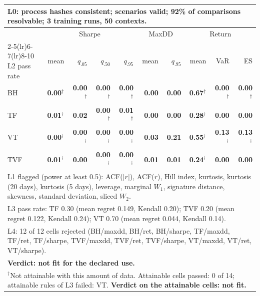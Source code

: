 \begin{tabular}{lrrrrrrrrr}
\toprule
\multicolumn{10}{p{13.5cm}}{L0: process hashes consistent; scenarios valid; 92\% of comparisons resolvable; 3 training runs, 50 contexts.} \\
\midrule
 & \multicolumn{4}{c}{Sharpe} & \multicolumn{2}{c}{MaxDD} & \multicolumn{3}{c}{Return} \\
\cmidrule(lr){2-5}\cmidrule(lr){6-7}\cmidrule(lr){8-10}
L2 pass rate & mean & $q_{.05}$ & $q_{.50}$ & $q_{.95}$ & mean & $q_{.95}$ & mean & VaR & ES \\
\midrule
BH & \textbf{0.00}$^{\dagger}$ & \textbf{0.00}$^{\dagger}$ & \textbf{0.00}$^{\dagger}$ & \textbf{0.00}$^{\dagger}$ & \textbf{0.00} & \textbf{0.00} & \textbf{0.67}$^{\dagger}$ & \textbf{0.00}$^{\dagger}$ & \textbf{0.00}$^{\dagger}$ \\
TF & \textbf{0.01}$^{\dagger}$ & \textbf{0.02} & \textbf{0.00}$^{\dagger}$ & \textbf{0.01}$^{\dagger}$ & \textbf{0.00} & \textbf{0.00} & \textbf{0.28}$^{\dagger}$ & \textbf{0.00} & \textbf{0.00} \\
VT & \textbf{0.00}$^{\dagger}$ & \textbf{0.00}$^{\dagger}$ & \textbf{0.00}$^{\dagger}$ & \textbf{0.00}$^{\dagger}$ & \textbf{0.03} & \textbf{0.21} & \textbf{0.55}$^{\dagger}$ & \textbf{0.13}$^{\dagger}$ & \textbf{0.13}$^{\dagger}$ \\
TVF & \textbf{0.01}$^{\dagger}$ & \textbf{0.00} & \textbf{0.00}$^{\dagger}$ & \textbf{0.00}$^{\dagger}$ & \textbf{0.01} & \textbf{0.01} & \textbf{0.24}$^{\dagger}$ & \textbf{0.00} & \textbf{0.00} \\
\midrule
\multicolumn{10}{p{13.5cm}}{L1 flagged (power at least 0.5): ACF($|r|$), ACF($r$), Hill index, kurtosis, kurtosis (20 days), kurtosis (5 days), leverage, marginal $W_1$, signature distance, skewness, standard deviation, sliced $W_2$.} \\
\multicolumn{10}{p{13.5cm}}{L3 pass rate: TF 0.30 (mean regret 0.149, Kendall 0.20); TVF 0.20 (mean regret 0.122, Kendall 0.24); VT 0.70 (mean regret 0.044, Kendall 0.14).} \\
\multicolumn{10}{p{13.5cm}}{L4: 12 of 12 cells rejected (BH/maxdd, BH/ret, BH/sharpe, TF/maxdd, TF/ret, TF/sharpe, TVF/maxdd, TVF/ret, TVF/sharpe, VT/maxdd, VT/ret, VT/sharpe).} \\
\multicolumn{10}{p{13.5cm}}{\textbf{Verdict: not fit for the declared use.}} \\
\multicolumn{10}{p{13.5cm}}{$^{\dagger}$Not attainable with this amount of data. Attainable cells passed: 0 of 14; attainable rules of L3 failed: VT. \textbf{Verdict on the attainable cells: not fit.}} \\
\bottomrule
\end{tabular}

